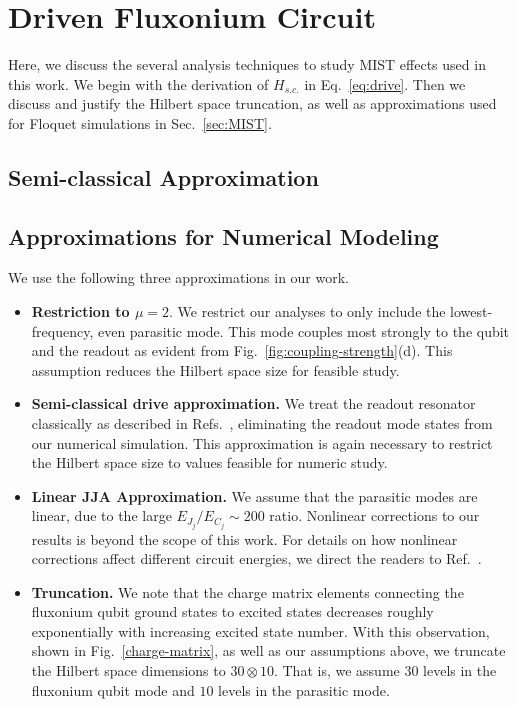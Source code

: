 \documentclass[%
reprint,
superscriptaddress,
 amsmath,amssymb,
 aps,
 prx,
longbibliography,
floatfix,
]{revtex4-2}
\newcommand{\sh}[1]{{\color{blue}{{}[SS: #1]}}}%
\begin{document}
\section{Driven Fluxonium Circuit}\label{app:MIST}
Here, we discuss the several analysis techniques to study MIST effects used in this work. We begin with the derivation of $H_{s.c.}$ in Eq.~\ref{eq:drive}. Then we discuss and justify the Hilbert space truncation, as well as approximations used for Floquet simulations in Sec.~\ref{sec:MIST}.
\subsection{Semi-classical Approximation}\label{app:semi-classical}
\sh{include the derivation}
\subsection{Approximations for Numerical Modeling}\label{app:numerics}
We use the following three approximations in our work.
\begin{itemize}
    \item \textbf{Restriction to $\mu=2$}. We restrict our analyses to only include the lowest-frequency, even parasitic mode. This mode couples most strongly to the qubit and the readout as evident from Fig.~\ref{fig:coupling-strength}(d). This assumption reduces the Hilbert space size for feasible study. 

    \item \textbf{Semi-classical drive approximation.}  We treat the readout resonator classically as described in Refs.~\cite{xiao2023diagrammatic,dumas2024unified,cohen2023reminiscence,khezri2023measurement}, eliminating the readout mode states from our numerical simulation. This approximation is again necessary to restrict the Hilbert space size to values feasible for numeric study.
    
    \item \textbf{Linear JJA Approximation.} We assume that the parasitic modes are linear, due to the large $E_{J_j}/E_{C_j} \sim 200$ ratio. Nonlinear corrections to our results is beyond the scope of this work. For details on how nonlinear corrections affect different circuit energies, we direct the readers to Ref.~\cite{viola2015collective}. 
    \item \textbf{Truncation.} We note that the charge matrix elements connecting the fluxonium qubit ground states to excited states decreases roughly exponentially with increasing excited state number. With this observation, shown in Fig.~\ref{charge-matrix}, as well as our assumptions above, we truncate the Hilbert space dimensions to $30\otimes 10$. That is, we assume $30$ levels in the fluxonium qubit mode and $10$ levels in the parasitic mode. 
    \end{itemize}
\end{document}

